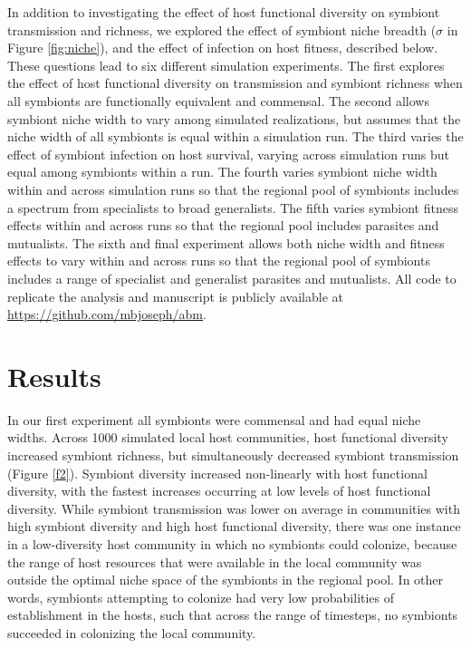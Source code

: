 \documentclass[12pt]{article}
\begin{document}
In addition to investigating the effect of host functional diversity on symbiont transmission and richness, we explored the effect of symbiont niche breadth ($\sigma$ in Figure \ref{fig:niche}), and the effect of infection on host fitness, described below. 
These questions lead to six different simulation experiments. %
The first explores the effect of host functional diversity on transmission and symbiont richness when all symbionts are functionally equivalent and commensal.
The second allows symbiont niche width to vary among simulated realizations, but assumes that the niche width of all symbionts is equal within a simulation run. 
The third varies the effect of symbiont infection on host survival, varying across simulation runs but equal among symbionts within a run. 
The fourth varies symbiont niche width within and across simulation runs so that the regional pool of symbionts includes a spectrum from specialists to broad generalists.
The fifth varies symbiont fitness effects within and across runs so that the regional pool includes parasites and mutualists.
The sixth and final experiment allows both niche width and fitness effects to vary within and across runs so that the regional pool of symbionts includes a range of specialist and generalist parasites and mutualists. 
All code to replicate the analysis and manuscript is publicly available at \url{https://github.com/mbjoseph/abm}.

\section*{Results}

In our first experiment all symbionts were commensal and had equal niche widths. 
Across 1000 simulated local host communities, host functional diversity increased symbiont richness, but simultaneously decreased symbiont transmission (Figure \ref{f2}). 
Symbiont diversity increased non-linearly with host functional diversity, with the fastest increases occurring at low levels of host functional diversity. 
While symbiont transmission was lower on average in communities with high symbiont diversity and high host functional diversity, there was one instance in a low-diversity host community in which no symbionts could colonize, because the range of host resources that were available in the local community was outside the optimal niche space of the symbionts in the regional pool. 
In other words, symbionts attempting to colonize had very low probabilities of establishment in the hosts, such that across the range of timesteps, no symbionts succeeded in colonizing the local community.  
\end{document}
